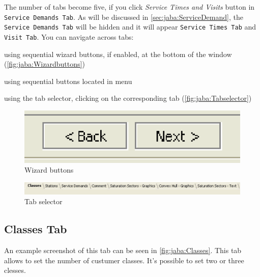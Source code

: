 The number of tabs become five, if you click  \emph{Service Times and
Visits} button in \texttt{Service Demands Tab}. As will be discussed
in \autoref{sec:jaba:ServiceDemand}, the \texttt{Service Demands
Tab} will be hidden and it will appear \texttt{Service Times Tab}
and \texttt{Visit Tab}. You can navigate across tabs:
\begin{itemize*}
\item using sequential wizard buttons, if enabled, at the bottom of
the window (\autoref{fig:jaba:Wizardbuttons})
\item using sequential buttons located in menu
\item using the tab selector, clicking on the corresponding
tab (\autoref{fig:jaba:Tabselector})
\end{itemize*}

\begin{figure}[htbp]
    \begin{center}
        \includegraphics[scale=.5]{img/jaba/wizBut}
    \end{center}
    \caption{Wizard buttons}
    \label{fig:jaba:Wizardbuttons}
\end{figure}

\begin{figure}[htbp]
    \begin{center}
        \includegraphics[scale=.5]{img/jaba/tabSel}
    \end{center}
    \caption{Tab selector}
    \label{fig:jaba:Tabselector}
\end{figure}

\subsection{Classes Tab}
An example screenshot of this tab can be seen in
\autoref{fig:jaba:Classes}. This tab allows to set the number of custumer classes.
It's possible to set two or three clesses.

